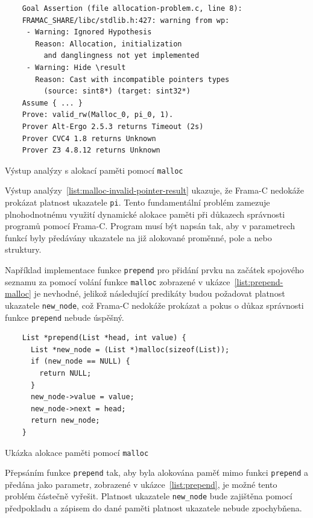 \begin{listing}[H]
    \begin{verbatim}
    Goal Assertion (file allocation-problem.c, line 8):
    FRAMAC_SHARE/libc/stdlib.h:427: warning from wp:
     - Warning: Ignored Hypothesis
       Reason: Allocation, initialization
         and danglingness not yet implemented
     - Warning: Hide \result
       Reason: Cast with incompatible pointers types
         (source: sint8*) (target: sint32*)
    Assume { ... }
    Prove: valid_rw(Malloc_0, pi_0, 1).
    Prover Alt-Ergo 2.5.3 returns Timeout (2s)
    Prover CVC4 1.8 returns Unknown
    Prover Z3 4.8.12 returns Unknown
    \end{verbatim}
    \caption{Výstup analýzy s alokací paměti pomocí \texttt{malloc}}
    \label{list:malloc-invalid-pointer-result}
\end{listing}

Výstup analýzy~\ref{list:malloc-invalid-pointer-result} ukazuje,
že Frama\mbox{-}C nedokáže prokázat platnost ukazatele \texttt{pi}.
Tento fundamentální problém zamezuje plnohodnotnému využití dynamické alokace paměti
při důkazech správnosti programů pomocí Frama\mbox{-}C\@.
Program musí být napsán tak,
aby v parametrech funkcí byly předávány ukazatele na již alokované proměnné,
pole a nebo struktury.

Například implementace funkce \texttt{prepend} pro přidání prvku na začátek spojového seznamu
za pomocí volání funkce \texttt{malloc} zobrazené v ukázce~\ref{list:prepend-malloc} je nevhodné,
jelikož následující predikáty budou požadovat platnost ukazatele \texttt{new\_node},
což Frama\mbox{-}C nedokáže prokázat a pokus o důkaz správnosti funkce \texttt{prepend}
nebude úspěšný.

\begin{listing}[H]
    \begin{verbatim}
    List *prepend(List *head, int value) {
      List *new_node = (List *)malloc(sizeof(List));
      if (new_node == NULL) {
        return NULL;
      }
      new_node->value = value;
      new_node->next = head;
      return new_node;
    }
    \end{verbatim}
    \caption{Ukázka alokace paměti pomocí \texttt{malloc}}
    \label{list:prepend-malloc}
\end{listing}

Přepsáním funkce \texttt{prepend} tak,
aby byla alokována paměť mimo funkci \texttt{prepend} a předána jako parametr,
zobrazené v ukázce~\ref{list:prepend},
je možné tento problém částečně vyřešit.
Platnost ukazatele \texttt{new\_node} bude zajištěna pomocí předpokladu
a zápisem do dané paměti platnost ukazatele nebude zpochybňena.

